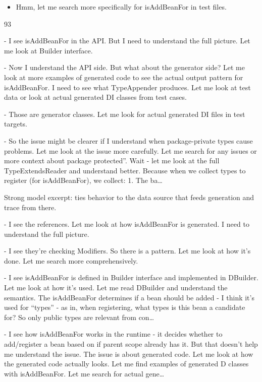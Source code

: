 \documentclass[
  10
]{article}
\providecommand{\tightlist}{%
  \setlength{\itemsep}{0pt}\setlength{\parskip}{0pt}}
\begin{document}
\begin{itemize}
\tightlist
\item
  Hmm, let me search more specifically for isAddBeanFor in test files.
\end{itemize}

93

- I see isAddBeanFor in the API. But I need to understand the full
picture. Let me look at Builder interface.

- Now I understand the API side. But what about the generator side? Let
me look at more examples of generated code to see the actual output
pattern for isAddBeanFor. I need to see what TypeAppender produces. Let
me look at test data or look at actual generated DI classes from test
cases.

- Those are generator classes. Let me look for actual generated DI files
in test targets.

- So the issue might be clearer if I understand when package-private
types cause problems. Let me look at the issue more carefully. Let me
search for any issues or more context about package protected''. Wait -
let me look at the full TypeExtendsReader and understand better. Because
when we collect types to register (for isAddBeanFor), we collect: 1. The
ba\ldots{}

Strong model excerpt: ties behavior to the data source that feeds
generation and trace from there.

- I see the references. Let me look at how isAddBeanFor is generated. I
need to understand the full picture.

- I see they're checking Modifiers. So there is a pattern. Let me look
at how it's done. Let me search more comprehensively.

- I see isAddBeanFor is defined in Builder interface and implemented in
DBuilder. Let me look at how it's used. Let me read DBuilder and
understand the semantics. The isAddBeanFor determines if a bean should
be added - I think it's used for ``types'' - as in, when registering,
what types is this bean a candidate for? So only public types are
relevant from con\ldots{}

- I see how isAddBeanFor works in the runtime - it decides whether to
add/register a bean based on if parent scope already has it. But that
doesn't help me understand the issue. The issue is about generated code.
Let me look at how the generated code actually looks. Let me find
examples of generated D classes with isAddBeanFor. Let me search for
actual gene\ldots{}
\end{document}
